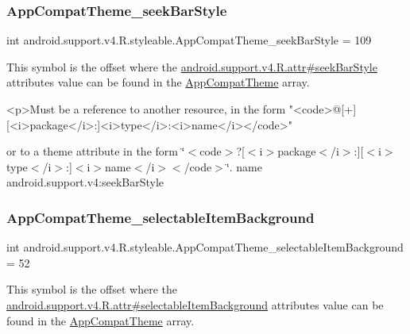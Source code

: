 \subsubsection{\texorpdfstring{App\+Compat\+Theme\+\_\+seek\+Bar\+Style}{AppCompatTheme\_seekBarStyle}}
{\footnotesize\ttfamily int android.\+support.\+v4.\+R.\+styleable.\+App\+Compat\+Theme\+\_\+seek\+Bar\+Style = 109\hspace{0.3cm}{\ttfamily [static]}}

This symbol is the offset where the \hyperlink{classandroid_1_1support_1_1v4_1_1R_1_1attr_a1ad9bf745f8300ae35266d3f158e4ae1}{android.\+support.\+v4.\+R.\+attr\#seek\+Bar\+Style} attribute\textquotesingle{}s value can be found in the \hyperlink{classandroid_1_1support_1_1v4_1_1R_1_1styleable_ac07ebbe62ed977f6dcaadc6397840ace}{App\+Compat\+Theme} array.

\begin{DoxyVerb}      <p>Must be a reference to another resource, in the form "<code>@[+][<i>package</i>:]<i>type</i>:<i>name</i></code>"
\end{DoxyVerb}
 or to a theme attribute in the form \char`\"{}$<$code$>$?\mbox{[}$<$i$>$package$<$/i$>$\+:\mbox{]}\mbox{[}$<$i$>$type$<$/i$>$\+:\mbox{]}$<$i$>$name$<$/i$>$$<$/code$>$\char`\"{}.  name android.\+support.\+v4\+:seek\+Bar\+Style \mbox{\label{classandroid_1_1support_1_1v4_1_1R_1_1styleable_a3e75027080282e399085b17ac981b5be}} 
\subsubsection{\texorpdfstring{App\+Compat\+Theme\+\_\+selectable\+Item\+Background}{AppCompatTheme\_selectableItemBackground}}
{\footnotesize\ttfamily int android.\+support.\+v4.\+R.\+styleable.\+App\+Compat\+Theme\+\_\+selectable\+Item\+Background = 52\hspace{0.3cm}{\ttfamily [static]}}

This symbol is the offset where the \hyperlink{classandroid_1_1support_1_1v4_1_1R_1_1attr_ad8f2ff9ffc480605ea9be198ddab859c}{android.\+support.\+v4.\+R.\+attr\#selectable\+Item\+Background} attribute\textquotesingle{}s value can be found in the \hyperlink{classandroid_1_1support_1_1v4_1_1R_1_1styleable_ac07ebbe62ed977f6dcaadc6397840ace}{App\+Compat\+Theme} array.

